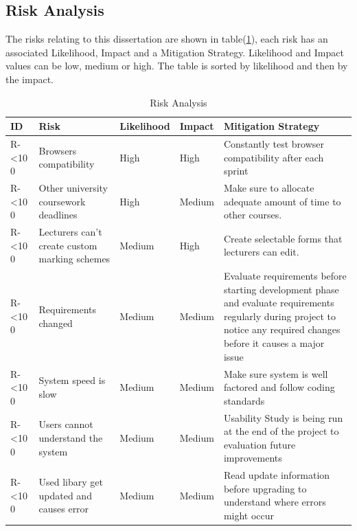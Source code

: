 \documentclass[12pt]{article}  %
\newcommand{\rid}[1]{\centering #1-\ifnum\value{requirement}<10 0\fi\arabic{requirement} \stepcounter{requirement}}
\begin{document}
\subsection{Risk Analysis}

The risks relating to this dissertation are shown in table(\ref{table:risks}), each risk has an associated Likelihood, Impact and a Mitigation Strategy. Likelihood and Impact values can be low, medium or high. The table is sorted by likelihood and then by the impact.

\begin{spacing}{1.2}
\begin{longtable}{|p{}|p{}|p{}|p{}|p{}|}
\caption{Risk Analysis} \label{table:risks} \\
\hline

\textbf{ID} & \textbf{Risk} & \textbf{Likelihood} & \textbf{Impact } & \textbf{Mitigation Strategy}\\
\hline

\rid{R} & Browsers compatibility & High & High & Constantly test browser compatibility after each sprint\\ \hline

\rid{R} & Other university coursework deadlines & High & Medium & Make sure to allocate adequate amount of time to other courses.\\ \hline



\rid{R} & Lecturers can’t create custom marking schemes & Medium & High & Create selectable forms that lecturers can edit.\\ \hline

\rid{R} & Requirements changed & Medium & Medium & Evaluate requirements before starting development phase and evaluate requirements regularly during project to notice any required changes before it causes a major issue \\ \hline

\rid{R} & System speed is slow & Medium & Medium & Make sure system is well factored and follow coding standards \\ \hline

\rid{R} & Users cannot understand the system & Medium & Medium & Usability Study is being run at the end of the project to evaluation future improvements\\ \hline

\rid{R} & Used libary get updated and causes error & Medium & Medium & Read update information before upgrading to understand where errors might occur\\ \hline


\end{longtable}
\end{spacing}
\end{document}
